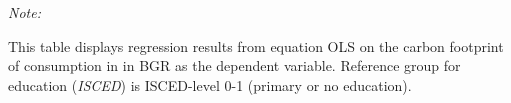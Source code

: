 \begin{table}[htbp!]
\begin{adjustbox}{width = 1\textwidth, max height = 0.95\textheight, center}
\begin{threeparttable}[b]
         \begin{tablenotes}\item \medskip \textit{Note:}
            \item This table displays regression results from equation OLS on the carbon footprint of consumption in  in BGR as the dependent variable.  Reference group for education (\textit{ISCED}) is ISCED-level 0-1 (primary or no education).
         \end{tablenotes}
      \end{threeparttable}
   \end{adjustbox}
\end{table}


